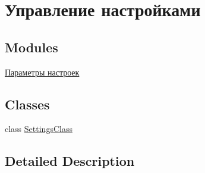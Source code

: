 \hypertarget{group___settings}{}\section{Управление настройками}
\label{group___settings}
\subsection*{Modules}
\begin{DoxyCompactItemize}
\item 
\hyperlink{group___params}{Параметры настроек}
\end{DoxyCompactItemize}
\subsection*{Classes}
\begin{DoxyCompactItemize}
\item 
class \hyperlink{class_settings_class}{Settings\+Class}
\end{DoxyCompactItemize}


\subsection{Detailed Description}

